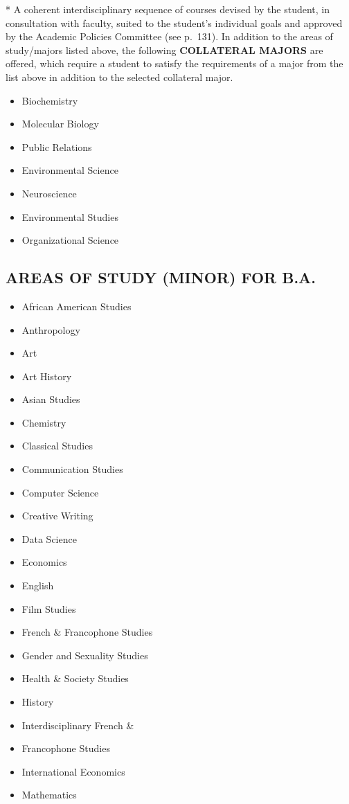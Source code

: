 \documentclass[
  letterpaper,
]{scrbook}
\providecommand{\tightlist}{%
  \setlength{\itemsep}{0pt}\setlength{\parskip}{0pt}}
\begin{document}
* A coherent interdisciplinary sequence of courses devised by the
student, in consultation with faculty, suited to the student's
individual goals and approved by the Academic Policies Committee (see
p.~131). In addition to the areas of study/majors listed above, the
following \textbf{COLLATERAL MAJORS} are offered, which require a
student to satisfy the requirements of a major from the list above in
addition to the selected collateral major.

\begin{itemize}
\tightlist
\item
  Biochemistry
\item
  Molecular Biology
\item
  Public Relations
\item
  Environmental Science
\item
  Neuroscience
\item
  Environmental Studies
\item
  Organizational Science
\end{itemize}

\subsection{AREAS OF STUDY (MINOR) FOR
B.A.}\label{areas-of-study-minor-for-b.a.}

\begin{itemize}
\tightlist
\item
  African American Studies
\item
  Anthropology
\item
  Art
\item
  Art History
\item
  Asian Studies
\item
  Chemistry
\item
  Classical Studies
\item
  Communication Studies
\item
  Computer Science
\item
  Creative Writing
\item
  Data Science
\item
  Economics
\item
  English
\item
  Film Studies
\item
  French \& Francophone Studies
\item
  Gender and Sexuality Studies
\item
  Health \& Society Studies
\item
  History
\item
  Interdisciplinary French \&
\item
  Francophone Studies
\item
  International Economics
\item
  Mathematics
\end{itemize}
\end{document}
